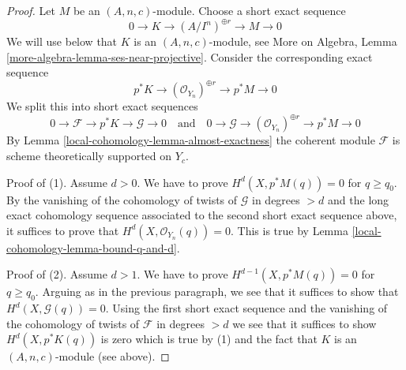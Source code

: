 \begin{proof}
Let $M$ be an $(A, n, c)$-module. Choose a short exact sequence
$$
0 \to K \to (A/I^n)^{\oplus r} \to M \to 0
$$
We will use below that $K$ is an $(A, n, c)$-module, see More on Algebra,
Lemma \ref{more-algebra-lemma-ses-near-projective}.
Consider the corresponding exact sequence
$$
p^*K \to (\mathcal{O}_{Y_n})^{\oplus r} \to p^*M \to 0
$$
We split this into short exact sequences
$$
0 \to \mathcal{F} \to p^*K \to \mathcal{G} \to 0
\quad\text{and}\quad
0 \to \mathcal{G} \to (\mathcal{O}_{Y_n})^{\oplus r} \to p^*M \to 0
$$
By Lemma \ref{local-cohomology-lemma-almost-exactness} the coherent module $\mathcal{F}$
is scheme theoretically supported on $Y_c$.

\medskip\noindent
Proof of (1). Assume $d > 0$. We have to prove
$H^d(X, p^*M(q)) = 0$ for $q \geq q_0$.
By the vanishing of the cohomology of twists of $\mathcal{G}$ in degrees $> d$
and the long exact cohomology sequence associated to the second
short exact sequence above, it suffices to prove that
$H^d(X, \mathcal{O}_{Y_n}(q)) = 0$.
This is true by Lemma \ref{local-cohomology-lemma-bound-q-and-d}.

\medskip\noindent
Proof of (2). Assume $d > 1$. We have to prove
$H^{d - 1}(X, p^*M(q)) = 0$ for $q \geq q_0$.
Arguing as in the previous paragraph, we see that it suffices
to show that $H^d(X, \mathcal{G}(q)) = 0$. Using the first
short exact sequence and the vanishing of the cohomology
of twists of $\mathcal{F}$ in degrees $> d$ we see that it suffices
to show $H^d(X, p^*K(q))$ is zero which is
true by (1) and the fact that $K$ is an $(A, n, c)$-module (see above).


\end{proof}
